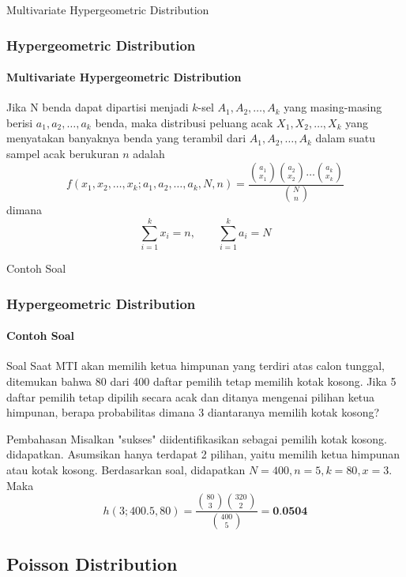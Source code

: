 \documentclass[]{beamer}
\begin{document}
\begin{frame}{Multivariate Hypergeometric Distribution}
    \frametitle{Hypergeometric Distribution}
    \framesubtitle{Multivariate Hypergeometric Distribution}
    Jika N benda dapat dipartisi menjadi $k$-sel $A_1, A_2,\dots,A_k$ yang masing-masing berisi $a_1, a_2, \dots, a_k$ benda, maka distribusi peluang acak $X_1, X_2,\dots,X_k$ yang menyatakan banyaknya benda yang terambil dari $A_1, A_2,\dots,A_k$ dalam suatu sampel acak berukuran $n$ adalah
    \begin{equation*}
        f(x_1,x_2,\dots,x_k;a_1,a_2,\dots,a_k,N,n) = \frac{\binom{a_1}{x_1}\binom{a_2}{x_2}\dots \binom{a_k}{x_k}}{\binom{N}{n}}
    \end{equation*}
    dimana
    \begin{equation*}
        \sum_{i=1}^kx_i = n, \qquad \sum_{i=1}^ka_i = N
    \end{equation*}
\end{frame}

\begin{frame}{Contoh Soal}
\frametitle{Hypergeometric Distribution}
\framesubtitle{Contoh Soal}
    \begin{block}{Soal}
    \scriptsize
        Saat MTI akan memilih ketua himpunan yang terdiri atas calon tunggal,  ditemukan bahwa 80 dari 400 daftar pemilih tetap memilih kotak kosong. Jika 5 daftar pemilih tetap dipilih secara acak dan ditanya mengenai pilihan ketua himpunan, berapa probabilitas dimana 3 diantaranya memilih kotak kosong?
    \end{block}
    \begin{exampleblock}{Pembahasan}
        Misalkan "sukses" diidentifikasikan sebagai pemilih kotak kosong. didapatkan. Asumsikan hanya terdapat 2 pilihan, yaitu memilih ketua himpunan atau kotak kosong. Berdasarkan soal, didapatkan $N=400, n=5, k=80, x=3$. Maka
        \begin{equation*}
            h(3;400.5,80) =\frac{\binom{80}{3}\binom{320}{2}}{\binom{400}{5}}=\textbf{0.0504}
        \end{equation*}
    \end{exampleblock}
\end{frame}
\subsection{Poisson Distribution}
\end{document}
